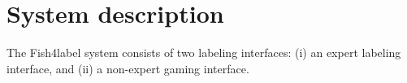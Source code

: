 \documentclass{sig-alternate}
\newcommand{\todo}[1]{\textcolor{red}{[Todo: #1]}}
\begin{document}
%
%
%


\section{System description}
The Fish4label system consists of two labeling interfaces: (i) an expert labeling interface, 
and (ii) a non-expert gaming interface. 
%
\end{document}
